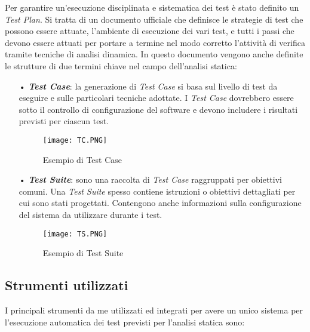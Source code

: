 Per garantire un'esecuzione disciplinata e sistematica dei test è stato definito un \textit{Test Plan}. Si tratta di un documento ufficiale che definisce le strategie di test che possono essere attuate, l'ambiente di esecuzione dei vari test, e tutti i passi che devono essere attuati per portare a termine nel modo corretto l'attività di verifica tramite tecniche di analisi dinamica. In questo documento vengono anche definite le strutture di due termini chiave nel campo dell'analisi statica:
\begin{itemize}
\item[•] \textit{\textbf{Test Case}}: la generazione di \textit{Test Case} si basa sul livello di test da eseguire e sulle particolari tecniche adottate. I \textit{Test Case} dovrebbero essere sotto il controllo di configurazione del software e devono includere i risultati previsti per ciascun test.

\begin{figure}[H]
  \centering
  \texttt{[image: TC.PNG]}
  \caption{Esempio di Test Case}
\end{figure}


\item[•] \textit{\textbf{Test Suite}}: sono una raccolta di \textit{Test Case} raggruppati per obiettivi comuni. Una \textit{Test Suite} spesso contiene istruzioni o obiettivi dettagliati per cui sono stati progettati. Contengono anche informazioni sulla configurazione del sistema da utilizzare durante i test.

\begin{figure}[H]
  \centering
  \texttt{[image: TS.PNG]}
  \caption{Esempio di Test Suite}
\end{figure}
\end{itemize}


\subsection{Strumenti utilizzati}
I principali strumenti da me utilizzati ed integrati per avere un unico sistema per l'esecuzione automatica dei test previsti per l'analisi statica sono:

